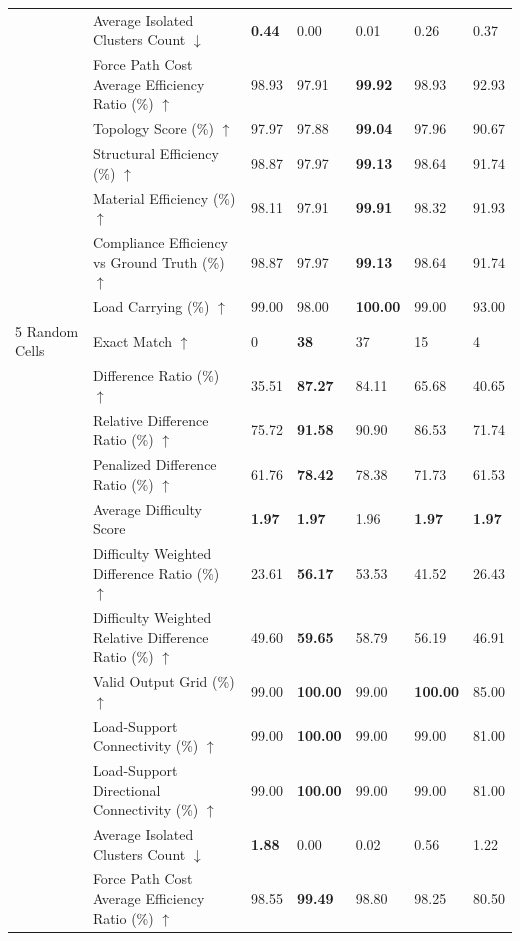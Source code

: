 \begin{table}[!h]
{\begin{tabular}{lllllll}
 & Average Isolated Clusters Count $\downarrow$ & \textbf{0.44} & 0.00 & 0.01 & 0.26 & 0.37 \\
 & Force Path Cost Average Efficiency Ratio (\%) $\uparrow$ & 98.93 & 97.91 & \textbf{99.92} & 98.93 & 92.93 \\
 & Topology Score (\%) $\uparrow$ & 97.97 & 97.88 & \textbf{99.04} & 97.96 & 90.67 \\
 & Structural Efficiency (\%) $\uparrow$ & 98.87 & 97.97 & \textbf{99.13} & 98.64 & 91.74 \\
 & Material Efficiency (\%) $\uparrow$ & 98.11 & 97.91 & \textbf{99.91} & 98.32 & 91.93 \\
 & Compliance Efficiency vs Ground Truth (\%) $\uparrow$ & 98.87 & 97.97 & \textbf{99.13} & 98.64 & 91.74 \\
 & Load Carrying (\%) $\uparrow$ & 99.00 & 98.00 & \textbf{100.00} & 99.00 & 93.00 \\
5 Random Cells & Exact Match $\uparrow$ & 0 & \textbf{38} & 37 & 15 & 4 \\
 & Difference Ratio (\%) $\uparrow$ & 35.51 & \textbf{87.27} & 84.11 & 65.68 & 40.65 \\
 & Relative Difference Ratio (\%) $\uparrow$ & 75.72 & \textbf{91.58} & 90.90 & 86.53 & 71.74 \\
 & Penalized Difference Ratio (\%) $\uparrow$ & 61.76 & \textbf{78.42} & 78.38 & 71.73 & 61.53 \\
 & Average Difficulty Score & \textbf{1.97} & \textbf{1.97} & 1.96 & \textbf{1.97} & \textbf{1.97} \\
 & Difficulty Weighted Difference Ratio (\%) $\uparrow$ & 23.61 & \textbf{56.17} & 53.53 & 41.52 & 26.43 \\
 & Difficulty Weighted Relative Difference Ratio (\%) $\uparrow$ & 49.60 & \textbf{59.65} & 58.79 & 56.19 & 46.91 \\
 & Valid Output Grid (\%) $\uparrow$ & 99.00 & \textbf{100.00} & 99.00 & \textbf{100.00} & 85.00 \\
 & Load-Support Connectivity (\%) $\uparrow$ & 99.00 & \textbf{100.00} & 99.00 & 99.00 & 81.00 \\
 & Load-Support Directional Connectivity (\%) $\uparrow$ & 99.00 & \textbf{100.00} & 99.00 & 99.00 & 81.00 \\
 & Average Isolated Clusters Count $\downarrow$ & \textbf{1.88} & 0.00 & 0.02 & 0.56 & 1.22 \\
 & Force Path Cost Average Efficiency Ratio (\%) $\uparrow$ & 98.55 & \textbf{99.49} & 98.80 & 98.25 & 80.50 \\

\end{tabular}}
\end{table}
